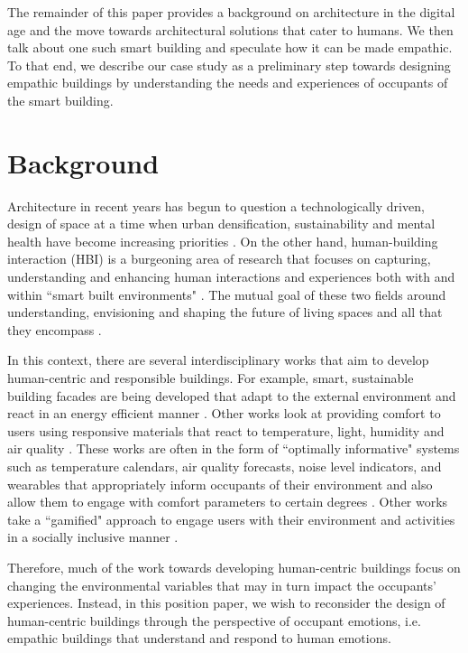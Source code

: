 \documentclass [sigconf, review, anonymous] {acmart}
\begin{document}
The remainder of this paper provides a background on architecture in the digital age and the move towards architectural solutions that cater to humans. We then talk about one such smart building and speculate how it can be made empathic. To that end, we describe our case study as a preliminary step towards designing empathic buildings by understanding the needs and experiences of occupants of the smart building. 


\section{Background}
Architecture in recent years has begun to question a technologically driven,  design of space at a time when urban densification, sustainability and mental health have become increasing priorities \cite{derix2014empathic}. On the other hand, human-building interaction (HBI) is a burgeoning area of research that focuses on capturing, understanding and enhancing human interactions and experiences both with and within ``smart built environments" \cite{alavi2016future}. The mutual goal of these two fields  around understanding,  envisioning and shaping the future of living spaces and all that they encompass \cite{nembrini2017human, alavi2018artifacts}. 

In this context, there are several interdisciplinary works that aim to develop human-centric and responsible buildings. For example, smart, sustainable building facades are being developed that adapt to the external environment and react in an energy efficient manner \cite{ahmed2015development}. Other works look at providing comfort to users using responsive materials that react to temperature, light, humidity and air quality \cite{fragkia2020exergy, holstov2015hygromorphic}. These works are often in the form of ``optimally informative" systems such as temperature calendars, air quality forecasts, noise level indicators, and wearables that appropriately inform occupants of their environment and also allow them to engage with comfort parameters to certain degrees  \cite{costanza2016bit, kim2020designing}. Other works take a ``gamified" approach to engage users with their environment and activities in a socially inclusive manner \cite{mathur2015tiny, zhong2022augmenting}. 

Therefore, much of the work towards developing human-centric buildings focus on changing the environmental variables that may in turn impact the occupants' experiences. Instead, in this position paper, we wish to reconsider the design of human-centric buildings through the perspective of occupant emotions, i.e. empathic buildings that understand and respond to human emotions.
\end{document}
